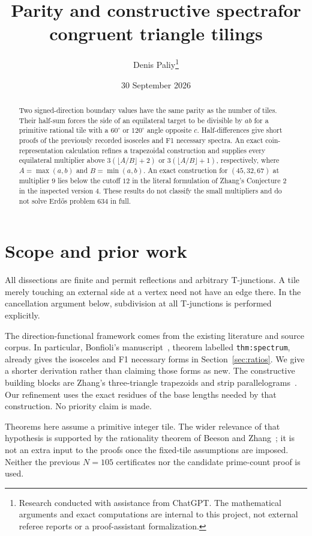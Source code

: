 \documentclass[11pt]{article}
\title{Parity and constructive spectra\newline for congruent triangle tilings}
\author{Denis Paliy\thanks{Research conducted with assistance from ChatGPT. The mathematical arguments and exact computations are internal to this project, not external referee reports or a proof-assistant formalization.}}
\date{30 September 2026}
\begin{document}
\maketitle
\begin{abstract}
Two signed-direction boundary values have the same parity as the number of tiles. Their half-sum forces the side of an equilateral target to be divisible by $ab$ for a primitive rational tile with a $60^\circ$ or $120^\circ$ angle opposite $c$. Half-differences give short proofs of the previously recorded isosceles and F1 necessary spectra. An exact coin-representation calculation refines a trapezoidal construction and supplies every equilateral multiplier above $3(\lfloor A/B\rfloor+2)$ or $3(\lfloor A/B\rfloor+1)$, respectively, where $A=\max(a,b)$ and $B=\min(a,b)$. An exact construction for $(45,32,67)$ at multiplier $9$ lies below the cutoff $12$ in the literal formulation of Zhang's Conjecture 2 in the inspected version 4. These results do not classify the small multipliers and do not solve Erd\H{o}s problem 634 in full.
\end{abstract}

\section{Scope and prior work}
All dissections are finite and permit reflections and arbitrary T-junctions. A tile merely touching an external side at a vertex need not have an edge there. In the cancellation argument below, subdivision at all T-junctions is performed explicitly.

The direction-functional framework comes from the existing literature and source corpus. In particular, Bonfioli's manuscript~\cite{Bonfioli}, theorem labelled \texttt{thm:spectrum}, already gives the isosceles and F1 necessary forms in Section~\ref{sec:ratios}. We give a shorter derivation rather than claiming those forms as new. The constructive building blocks are Zhang's three-triangle trapezoids and strip parallelograms~\cite{Zhang}. Our refinement uses the exact residues of the base lengths needed by that construction. No priority claim is made.

Theorems here assume a primitive integer tile. The wider relevance of that hypothesis is supported by the rationality theorem of Beeson and Zhang~\cite{Rationality}; it is not an extra input to the proofs once the fixed-tile assumptions are imposed. Neither the previous $N=105$ certificates nor the candidate prime-count proof is used.
\end{document}

